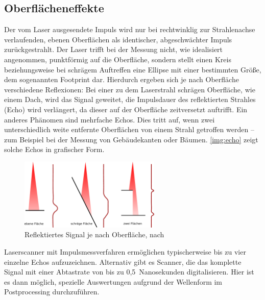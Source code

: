 \documentclass[a4paper,12pt,bibliography=totoc, listof=totoc,titlepage,pointlessnumbers]{scrreprt}
\begin{document}
\subsection{Oberflächeneffekte}
Der vom Laser ausgesendete Impuls wird nur bei rechtwinklig zur Strahlenachse verlaufenden, ebenen Oberflächen als identischer, abgeschwächter Impuls zurückgestrahlt. Der Laser trifft bei der Messung nicht, wie idealisiert angenommen, punktförmig auf die Oberfläche, sondern stellt einen Kreis beziehungsweise bei schrägem Auftreffen eine Ellipse mit einer bestimmten Größe, dem sogenannten Footprint dar. Hierdurch ergeben sich je nach Oberfläche verschiedene Reflexionen: Bei einer zu dem Laserstrahl schrägen Oberfläche, wie einem Dach, wird das Signal geweitet, die Impulsdauer des reflektierten Strahles (Echo) wird verlängert, da dieser auf der Oberfläche zeitversetzt auftrifft. Ein anderes Phänomen sind mehrfache Echos. Dies tritt auf, wenn zwei unterschiedlich weite entfernte Oberflächen von einem Strahl getroffen werden -- zum Beispiel bei der Messung von Gebäudekanten oder Bäumen. \autoref{img:echo} zeigt solche Echos in grafischer Form. \citep[S. 28]{beraldin}

\begin{figure}[!ht]
 \centering
 \includegraphics[width=0.6\textwidth]{./img/echo.pdf}
 \caption{Reflektiertes Signal je nach Oberfläche, nach \citet[S. 28]{beraldin}}
 \label{img:echo}
\end{figure}

Laser\-scan\-ner mit Impulsmessverfahren ermöglichen typischerweise bis zu vier einzelne Echos aufzuzeichnen. Alternativ gibt es Scanner, die das komplette Signal mit einer Abtastrate von bis zu 0,5~Nanosekunden digitalisieren. Hier ist es dann möglich, spezielle Auswertungen aufgrund der Wellenform im Postprocessing durchzuführen. \citep[S. 29]{beraldin}
\end{document}
